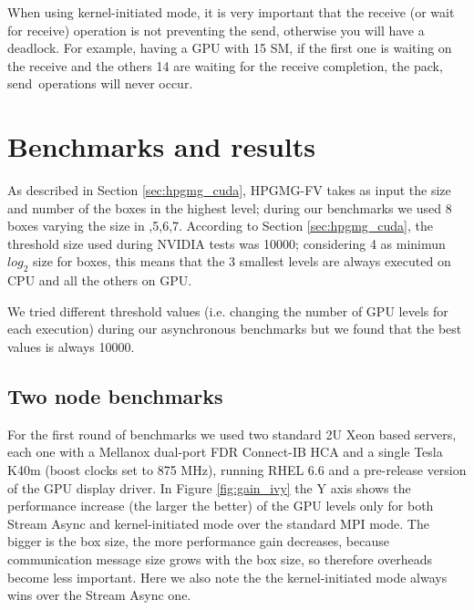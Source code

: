 \documentclass[conference]{IEEEtran}
\begin{document}
When using kernel-initiated mode, it is very important that the receive (or wait for receive) operation is not preventing the send, otherwise you will have a deadlock.
For example, having a GPU with 15 SM, if the first one is waiting on the receive and the others 14 are waiting for the receive completion, the \lbrack pack, send\rbrack \ operations will never occur.

\section{Benchmarks and results}

As described in Section \ref{sec:hpgmg_cuda}, HPGMG-FV takes as input the size and number of the boxes in the highest level; during our benchmarks we used 8 boxes varying the size in ,5,6,7\rbrack.
According to Section \ref{sec:hpgmg_cuda}, the threshold size used during NVIDIA tests was 10000; considering 4 as minimun $log_2$ size for boxes, this means that the 3 smallest levels are always executed on CPU and all the others on GPU.

We tried different threshold values (i.e. changing the number of GPU levels for each execution) during our asynchronous benchmarks but we found that the best values is always 10000.

\subsection{Two node benchmarks}

For the first round of benchmarks we used two standard 2U Xeon based
servers, each one with a Mellanox dual-port FDR Connect-IB HCA and a single
Tesla K40m (boost clocks set to 875 MHz), running RHEL 6.6 and a
pre-release version of the GPU display driver.
% 
In Figure \ref{fig:gain_ivy} the Y axis shows the performance increase (the
larger the better) of the GPU levels only for both Stream Async and
kernel-initiated mode over the standard MPI mode. 
%
The bigger is the box size, the more performance gain decreases, because
communication message size grows with the box size, so therefore
overheads become less important.
% 
Here we also note the the kernel-initiated mode always wins over the
Stream Async one.
\end{document}
